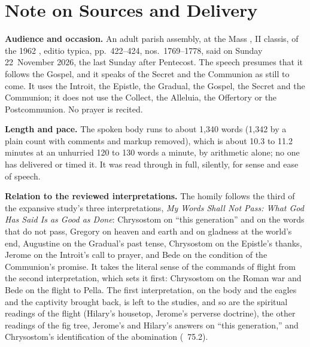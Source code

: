 
\section*{Note on Sources and Delivery}

{\footnotesize

\textbf{Audience and occasion.} An adult parish assembly, at the Mass
, II classis, of
the 1962 , editio typica, pp.~422--424,
nos.~1769--1778, said on Sunday 22~November 2026, the last Sunday after
Pentecost. The speech presumes that it follows the Gospel, and it speaks of
the Secret and the Communion as still to come. It uses the Introit, the
Epistle, the Gradual, the Gospel, the Secret and the Communion; it does not
use the Collect, the Alleluia, the Offertory or the Postcommunion. No prayer
is recited.

\textbf{Length and pace.} The spoken body runs to about 1,340 words (1,342 by
a plain count with comments and markup removed), which is about 10.3 to 11.2
minutes at an unhurried 120 to 130 words a minute, by arithmetic alone; no
one has delivered or timed it. It was read through in full, silently, for
sense and ease of speech.

\textbf{Relation to the reviewed interpretations.} The homily follows the
third of the expansive study's three interpretations, \textit{My Words Shall
Not Pass: What God Has Said Is as Good as Done}: Chrysostom on ``this
generation'' and on the words that do not pass, Gregory on heaven and earth
and on gladness at the world's end, Augustine on the Gradual's past tense,
Chrysostom on the Epistle's thanks, Jerome on the Introit's call to prayer,
and Bede on the condition of the Communion's promise. It takes the literal
sense of the commands of flight from the second interpretation, which sets
it first: Chrysostom on the Roman war and Bede on the flight to Pella. The
first interpretation, on the body and the eagles and the captivity brought
back, is left to the studies, and so are the spiritual readings of the
flight (Hilary's housetop, Jerome's perverse doctrine), the other readings
of the fig tree, Jerome's and Hilary's answers on ``this generation,'' and
Chrysostom's identification of the abomination (~75.2).

}
